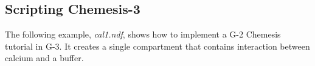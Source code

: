 \documentclass{article}
\begin{document}
%
%
%
%
%
%  
%
%

\subsection{Scripting Chemesis-3}

The following example, {\it cal1.ndf}, shows how to implement a G-2
Chemesis tutorial in G-3.  It creates a single compartment that
contains interaction between calcium and a buffer.

\end{document}
